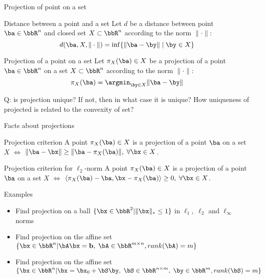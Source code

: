 \documentclass[12pt]{beamer}
\begin{document}
\begin{frame}{Projection of point on a set}
\small
\begin{block}{Distance between a point and a set}
Let $d$ be a distance between point $\ba \in \bbR^n$ and closed set $X \subset \bbR^n$ according to the norm $\| \cdot \|$:
\vspace{-4mm}
\[
d(\ba, X, \| \cdot \|) = \inf\{\| \ba - \by \| \; | \; \by \in X\}
\]
\end{block}
\begin{block}{Projection of a point on a set}
Let $\pi_X(\ba) \in X$ be a projection of a point $\ba \in \bbR^n$ on a set $X \subset \bbR^n$ according to the norm $\| \cdot \|$:
\vspace{-4mm}
\[
\pi_X(\ba) = \argmin_{\by \in X} \| \ba - \by \|
\]
\end{block}
Q: is projection unique? If not, then in what case it is unique? How uniqueness of projected is related to the convexity of set?

\end{frame}

\begin{frame}{Facts about projections}

\begin{block}{Projection criterion}
A point $\pi_X(\ba) \in X$ is a projection of a point $\ba$ on a set $X$ $\Leftrightarrow$ $\| \ba - \bx \| \geq \| \ba - \pi_X(\ba) \|, \; \forall \bx \in X$.
\end{block}

\begin{block}{Projection criterion for $\ell_2$-norm}
A point $\pi_X(\ba) \in X$ is a projection of a point $\ba$ on a set $X$ $\Leftrightarrow$ $\langle \pi_X(\ba) - \ba, \bx - \pi_X(\ba) \rangle \geq 0, \; \forall \bx \in X$.
\end{block}
\end{frame}

\begin{frame}{Examples}
\begin{itemize}
\item Find projection on a ball $\{\bx \in \bbR^2 | \| \bx \|_* \leq 1\}$ in $\ell_1, \; \ell_2$ and $\ell_{\infty}$ norms
\item Find projection on the affine set $\{ \bx \in \bbR^n | \bA\bx = \mathbf{b}, \; \bA \in \bbR^{m \times n}, rank(\bA) = m \}$
\item Find projection on the affine set $\{ \bx \in \bbR^n | \bx = \bx_0 + \bS\by, \; \bS \in \bbR^{n \times m}, \; \by \in \bbR^m, rank(\bS) = m \}$
\end{itemize}
\end{frame}
\end{document}
